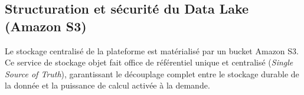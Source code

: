 



\subsection{Structuration et sécurité du Data Lake (Amazon S3)}
Le stockage centralisé de la plateforme est matérialisé par un bucket Amazon S3. Ce service de stockage objet fait office de référentiel unique et centralisé (\textit{Single Source of Truth}), garantissant le découplage complet entre le stockage durable de la donnée et la puissance de calcul activée à la demande.

